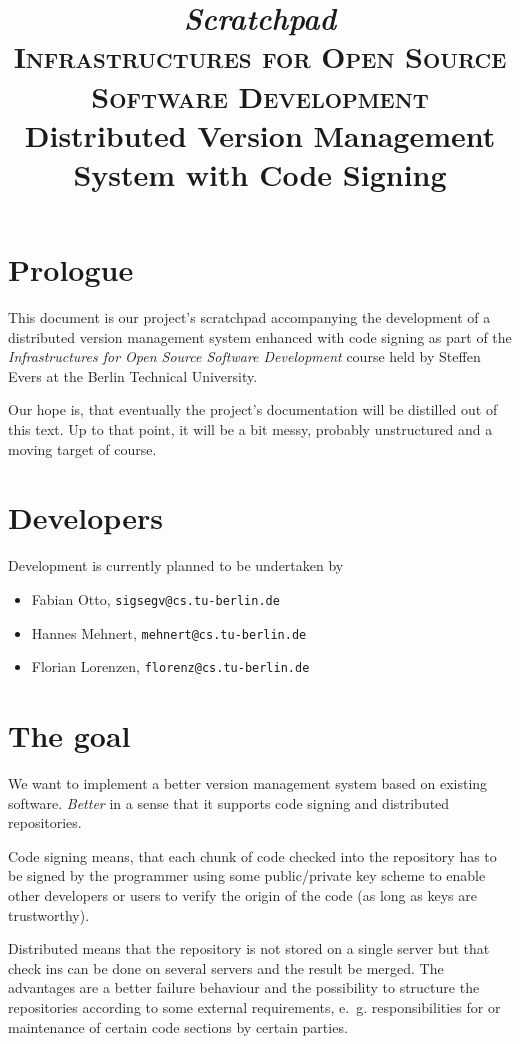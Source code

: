 \documentclass[fleqn, 10pt, a4paper]{article}
\begin{document}
\title{\emph{Scratchpad}\\
{\scshape Infrastructures for Open Source Software Development}\\
Distributed Version Management System with Code Signing}
\maketitle

\tableofcontents

\section{Prologue}
This document is our project's scratchpad accompanying the development
of a distributed version management system enhanced with code signing as
part of the \emph{Infrastructures for Open Source Software Development}
course held by Steffen Evers at the Berlin Technical University.

Our hope is, that eventually the project's documentation will be
distilled out of this text. Up to that point, it will be a bit messy,
probably unstructured and a moving target of course.

\section{Developers}
Development is currently planned to be undertaken by
\begin{itemize}
\item Fabian Otto, \texttt{sigsegv@cs.tu-berlin.de}
\item Hannes Mehnert, \texttt{mehnert@cs.tu-berlin.de}
\item Florian Lorenzen, \texttt{florenz@cs.tu-berlin.de}
\end{itemize}

\section{The goal}
We want to implement a better version management system based on
existing software. \emph{Better} in a sense that it supports
code signing and distributed repositories.

Code signing means, that each chunk of code checked into the repository
has to be signed by the programmer using some public/private key scheme
to enable other developers or users to verify the origin of the code (as
long as keys are trustworthy).

Distributed means that the repository is not stored on a single server
but that check ins can be done on several servers and the result be
merged. The advantages are a better failure behaviour and the
possibility to structure the repositories according to some external
requirements, e.~g. responsibilities for or maintenance of certain code
sections by certain parties.
\end{document}
